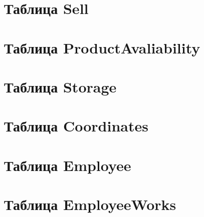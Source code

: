 \documentclass[14pt,a4paper,report]{report}
\let\Oldpart\part
\newcommand{\parttitle}{}
\renewcommand{\part}[1]{\Oldpart{#1}\renewcommand{\parttitle}{#1}}
\begin{document}
\part{Таблица Sell}




\part{Таблица ProductAvaliability}



\part{Таблица Storage}




\part{Таблица Coordinates}




\part{Таблица Employee}




\part{Таблица EmployeeWorks}
\end{document}
